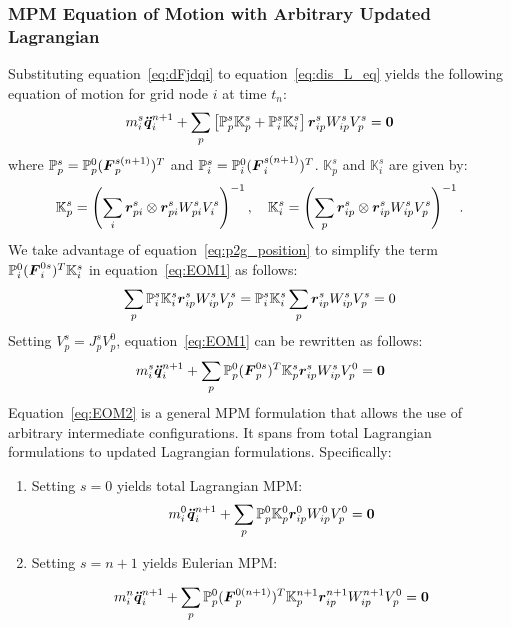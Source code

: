 \subsubsection{MPM Equation of Motion with Arbitrary Updated Lagrangian}
Substituting equation~\eqref{eq:dFjdqi} to equation~\eqref{eq:dis_L_eq} yields the following equation of motion for grid node $i$ at time $t_n$:
\begin{equation}
m_i^s\bs{\ddot{q}}_i^{n+1}+
\sum_p\left[\mathbb{P}_p^s\mathbb{K}_p^s+\mathbb{P}_i^s\mathbb{K}_i^s\right]\bs{r}_{ip}^s W_{ip}^s V_p^s=\bs{0}
\label{eq:EOM1}
\vspace{-3mm}
\end{equation}
where $\mathbb{P}_p^s=\mathbb{P}_p^0(\boldsymbol{F}_p^{s(n+1)})^T$ and $\mathbb{P}_i^s=\mathbb{P}_i^0(\boldsymbol{F}_i^{s(n+1)})^T$. $\mathbb{K}_p^s$ and $\mathbb{K}_i^s$ are given by:
\begin{equation*}
    \mathbb{K}_p^s=\left(\sum_i \boldsymbol{r}_{pi}^s\otimes\boldsymbol{r}_{pi}^s W_{pi}^s V_i^s\right)^{-1},\quad \mathbb{K}_i^s=\left(\sum_p \boldsymbol{r}_{ip}^s\otimes\boldsymbol{r}_{ip}^s W_{ip}^s V_p^s\right)^{-1}. 
\end{equation*}
We take advantage of equation~\eqref{eq:p2g_position} to simplify the term $\mathbb{P}_i^0(\boldsymbol{F}_i^{0s})^T\mathbb{K}_i^s$ in equation~\eqref{eq:EOM1} as follows:
$$\sum_p\mathbb{P}_i^s\mathbb{K}_i^s\boldsymbol{r}_{ip}^sW_{ip}^sV_p^s=\mathbb{P}_i^s\mathbb{K}_i^s\sum_p\boldsymbol{r}_{ip}^sW_{ip}^sV_p^s=0$$ %
Setting $V_p^s=J_p^sV_p^0$, equation~\eqref{eq:EOM1} can be rewritten as follows:
\begin{eqnarray}
m_i^s\bs{\ddot{q}}_i^{n+1}+
\sum_p \mathbb{P}_p^0(\bs{F}_p^{0s})^T\mathbb{K}_p^s\bs{r}_{ip}^s W_{ip}^s V_p^0=\bs{0}
\label{eq:EOM2}
\vspace{-3mm}
\end{eqnarray}
Equation~\eqref{eq:EOM2} is a general MPM formulation that allows the use of arbitrary intermediate configurations. It spans from total Lagrangian formulations to updated Lagrangian formulations. Specifically:
\begin{enumerate}
    \item Setting $s=0$ yields total Lagrangian MPM:
\begin{eqnarray}
m_i^0\boldsymbol{\ddot{q}}_i^{n+1}+
\sum_p \mathbb{P}_p^0\mathbb{K}_p^0\boldsymbol{r}_{ip}^0 W_{ip}^0 V_p^0=\boldsymbol{0}
\label{eq:TLMPM}
\end{eqnarray}

\item Setting $s=n+1$ yields Eulerian MPM:

\begin{eqnarray}
m_i^n\boldsymbol{\ddot{q}}_i^{n+1}+
\sum_p \mathbb{P}_p^0(\boldsymbol{F}_p^{0(n+1)})^T\mathbb{K}_p^{n+1}\boldsymbol{r}_{ip}^{n+1} W_{ip}^{n+1} V_p^0=\boldsymbol{0}
\label{eq:EMPM}
\end{eqnarray}
\end{enumerate}
